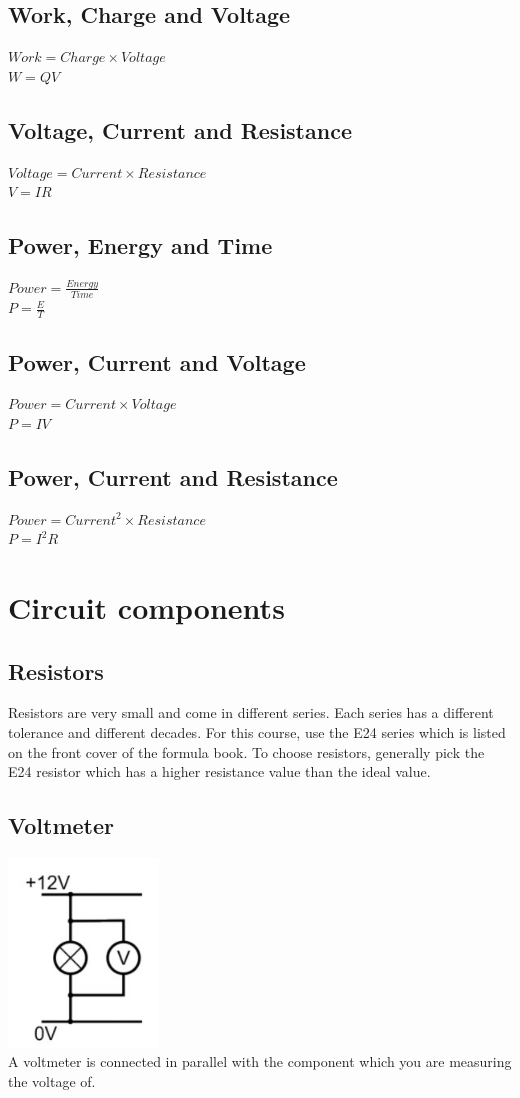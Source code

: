 \documentclass[a4paper,11pt, twocolumn]{article}
\begin{document}
\subsection{Work, Charge and Voltage}
$\displaystyle Work = Charge \times Voltage$\\
$W=QV$
\subsection{Voltage, Current and Resistance}
$Voltage = Current \times Resistance$\\
$V=IR$
\subsection{Power, Energy and Time}
$\displaystyle Power = \frac{Energy}{Time}$\\
$\displaystyle P=\frac{E}{T}$
\subsection{Power, Current and Voltage}
$Power = Current \times Voltage$\\
$P=IV$
\subsection{Power, Current and Resistance}
$Power = Current ^{2} \times Resistance$\\
$P=I^2R$

\section{Circuit components}
\subsection{Resistors}
Resistors are very small and come in different series. Each series has a different tolerance and different decades. For this course, use the E24 series which is listed on the front cover of the formula book. To choose resistors, generally pick the E24 resistor which has a higher resistance value than the ideal value. 
\subsection{Voltmeter}
\includegraphics[width=0.3\textwidth]{voltmeter.jpg}\\
A voltmeter is connected in parallel with the component which you are measuring the voltage of.
\end{document}
